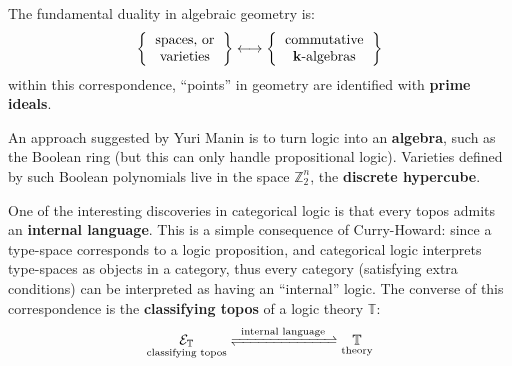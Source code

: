 \documentclass[runningheads]{llncs}
\begin{document}
The fundamental duality in algebraic geometry is:
\begin{equation}
\left\{ \begin{tabular}{cc} spaces, or \\ varieties \end{tabular} \right\} \longleftrightarrow \left\{ \begin{tabular}{cc} commutative \\ $\mathbf{k}$-algebras \end{tabular} \right\}
\end{equation}
within this correspondence, ``points'' in geometry are identified with \textbf{prime ideals}.

An approach suggested by Yuri Manin is to turn logic into an \textbf{algebra}, such as the Boolean ring (but this can only handle propositional logic).  Varieties defined by such Boolean polynomials \cite{Lundqvist2015} live in the space $\mathbb{Z}_2^n$, the \textbf{discrete hypercube}.  


One of the interesting discoveries in categorical logic is that every topos admits an \textbf{internal language}.  This is a simple consequence of Curry-Howard: since a type-space corresponds to a logic proposition, and categorical logic interprets type-spaces as objects in a category, thus every category (satisfying extra conditions) can be interpreted as having an ``internal'' logic.  The converse of this correspondence is the \textbf{classifying topos} of a logic theory $\mathbb{T}$:
\begin{equation}
\underset{\footnotesize\text{classifying topos}}{\mathcal{E}_\mathbb{T}} \xrightleftharpoons[]{\; \text{ internal language } \;} \underset{\footnotesize\text{theory}}{\mathbb{T}}
\end{equation}
\end{document}
